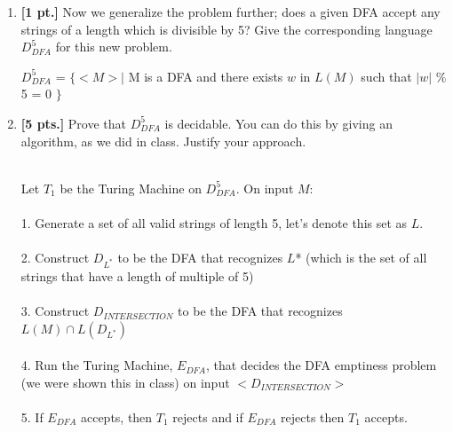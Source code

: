 \documentclass[11pt]{article}
\theoremstyle{definition}
\theoremstyle{theorem}
\newcommand{\solution}{\medskip\noindent{\color{blue}\textbf{Solution:}}}
\begin{document}
\begin{enumerate}[label=(\alph*)]
\item \textbf{[1 pt.]} Now we generalize the problem further; does a given DFA accept any strings of a length which is divisible by 5? Give the corresponding language $D^5_{DFA}$ for this new problem.

\solution


$D^5_{DFA}$ = $\{<M> |$ M is a DFA and there exists $w$ in $L(M)$ such that $|w|$ $\%$ 5 = 0 $\}$




\item \textbf{[5 pts.]} Prove that $D^5_{DFA}$ is decidable. You can do this by giving an algorithm, as we did in class. Justify your approach.

\solution
\\
Let $T_1$ be the Turing Machine on $D^5_{DFA}$. On input $M$: \\ ~ \\ 
1. Generate a set of all valid strings of length 5, let's denote this set as $L$. \\ ~ \\
2. Construct $D_{L^*}$ to be the DFA that recognizes $L$* (which is the set of all strings that have a length of multiple of 5)  \\ ~ \\
3. Construct $D_{INTERSECTION}$ to be the DFA that recognizes $L(M) \cap L(D_{L^*})$ \\ ~ \\
4. Run the Turing Machine, $E_{DFA}$, that decides the DFA emptiness problem (we were shown this in class) on input $<D_{INTERSECTION}>$ \\ ~ \\
5. If $E_{DFA}$ accepts, then $T_1$ rejects and if $E_{DFA}$ rejects then $T_1$ accepts. \\ ~ \\


\end{enumerate}
\end{document}

